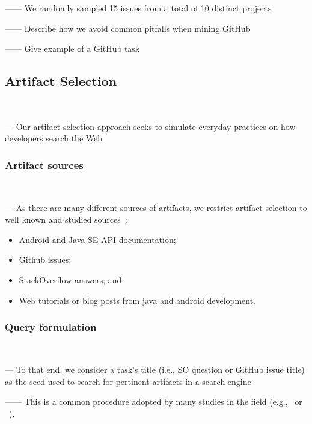 ------ We randomly sampled 15 issues from a total of 10 distinct projects

------ Describe how we avoid common pitfalls  when mining GitHub~\cite{kalliamvakou2014}

------ Give example of a GitHub task 

\subsection{Artifact Selection}
\label{cp4:corpus-artifacts}
\textcolor{white}{force ident} %


--- Our artifact selection approach seeks to simulate everyday practices on how developers search the Web~\cite{rao2020, Xia2017} \vspace{3mm}


\subsubsection{Artifact sources}
\textcolor{white}{force ident} %

--- As there are many different sources of artifacts, we restrict artifact selection to well known and studied sources~\cite{Starke2009,Kevic2014, Li2013}:


\begin{itemize}
    \item Android and Java SE API documentation;
    \item Github issues;
    \item StackOverflow answers; and
    \item Web tutorials or blog posts from java and android development.
\end{itemize}


\vspace{3mm}


\subsubsection{Query formulation}
\textcolor{white}{force ident} %

--- To that end, we consider a task's title (i.e., SO question or GitHub issue title) as the seed used to search for pertinent artifacts in a search engine

------ This is a common procedure adopted by many studies in the field (e.g.,~\cite{Xu2017} or ~\cite{Silva2019}). \vspace{3mm}


